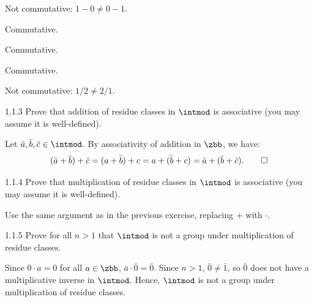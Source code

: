 \begin{solenum}
    \item Not commutative: $1 - 0 \neq 0 - 1$.
    \item Commutative.
    \item Commutative.
    \item Commutative.
    \item Not commutative: $1/2 \neq 2/1$.
\end{solenum}

\begin{exercise}{1.1.3}
    Prove that addition of residue classes in $\intmod$ is associative (you may assume it is well-defined).
\end{exercise}

\begin{sol}
    Let $\bar a, \bar b, \bar c \in \intmod$.
	By associativity of addition in $\zbb$, we have:
    \[
    	(\bar a + \bar b) + \bar c = \bar{(a + b) + c} = \bar{a + (b + c)} = \bar a + (\bar b + \bar c). \qedhere
    \]
\end{sol}

\begin{exercise}{1.1.4}
    Prove that multiplication of residue classes in $\intmod$ is associative (you may assume it is well-defined).
\end{exercise}

\begin{sol}
    Use the same argument as in the previous exercise, replacing $+$ with $\cdot$.
\end{sol}

\begin{exercise}{1.1.5}
    Prove for all $n > 1$ that $\intmod$ is not a group under multiplication of residue classes.
\end{exercise}

\begin{sol}
    Since $0 \cdot a = 0$ for all $a \in \zbb$, $\bar a \cdot \bar 0 = \bar 0$.
	Since $n > 1$, $\bar 0 \neq \bar 1$, so $\bar 0$ does not have a multiplicative inverse in $\intmod$.
	Hence, $\intmod$ is not a group under multiplication of residue classes.
\end{sol}

